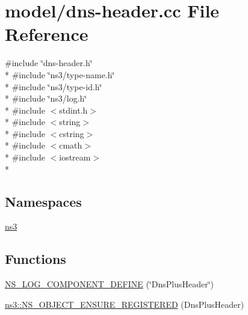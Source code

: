 \hypertarget{dns-header_8cc}{\section{model/dns-\/header.cc File Reference}
\label{dns-header_8cc}
}
{\ttfamily \#include \char`\"{}dns-\/header.\-h\char`\"{}}\\*
{\ttfamily \#include \char`\"{}ns3/type-\/name.\-h\char`\"{}}\\*
{\ttfamily \#include \char`\"{}ns3/type-\/id.\-h\char`\"{}}\\*
{\ttfamily \#include \char`\"{}ns3/log.\-h\char`\"{}}\\*
{\ttfamily \#include $<$stdint.\-h$>$}\\*
{\ttfamily \#include $<$string$>$}\\*
{\ttfamily \#include $<$cstring$>$}\\*
{\ttfamily \#include $<$cmath$>$}\\*
{\ttfamily \#include $<$iostream$>$}\\*
\subsection*{Namespaces}
\begin{DoxyCompactItemize}
\item 
\hyperlink{namespacens3}{ns3}
\end{DoxyCompactItemize}
\subsection*{Functions}
\begin{DoxyCompactItemize}
\item 
\hyperlink{dns-header_8cc_af7c141ed3adced3f487358709cd5cd2e}{N\-S\-\_\-\-L\-O\-G\-\_\-\-C\-O\-M\-P\-O\-N\-E\-N\-T\-\_\-\-D\-E\-F\-I\-N\-E} (\char`\"{}Dns\-Plus\-Header\char`\"{})
\item 
\hyperlink{namespacens3_a57376580499e06ddc7511faa940ee830}{ns3\-::\-N\-S\-\_\-\-O\-B\-J\-E\-C\-T\-\_\-\-E\-N\-S\-U\-R\-E\-\_\-\-R\-E\-G\-I\-S\-T\-E\-R\-E\-D} (Dns\-Plus\-Header)
\end{DoxyCompactItemize}


